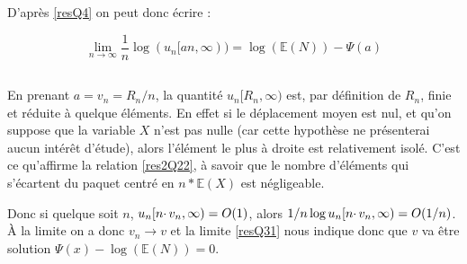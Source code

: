 \documentclass[12pt]{article}
\newcommand{\esp}{\mathbb{E}}
\begin{document}
			D'après \ref{resQ4} on peut donc écrire :
			
			\begin{equation}
				\boxed{\lim\limits_{n\to\infty}\frac{1}{n}\log (u_n[an,\infty)) = \log(\esp(N))-\Psi(a) \label{resQ31}}
			\end{equation}
			
		\subsection{} %
			
			En prenant $a=v_n=R_n/n$, la quantité $u_n[R_n,\infty)$ est, par définition de $R_n$, finie et réduite à quelque éléments. En effet si le déplacement moyen est nul, et qu'on suppose que la variable $X$ n'est pas nulle (car cette hypothèse ne présenterai aucun intérêt d'étude), alors l'élément le plus à droite est relativement isolé. C'est ce qu'affirme la relation \ref{res2Q22}, à savoir que le nombre d'éléments qui s'écartent du paquet centré en $n*\esp(X)$ est négligeable.
			
			Donc si quelque soit $n$, $u_n[n\cdotp v_n,\infty)={\LARGE O}(1)$, alors $1/n \log u_n[n\cdotp v_n,\infty) = {\LARGE O}(1/n)$. À la limite on a donc $v_n\to v$ et la limite \ref{resQ31} nous indique donc que $v$ va être solution $\Psi(x)-\log(\esp(N))=0$.
			\setcounter{subsection}{3}
			
			
			
\end{document}

